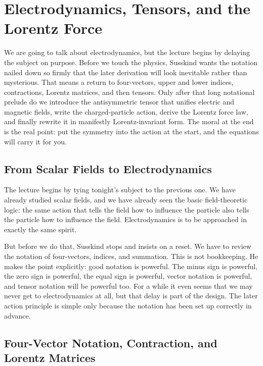 \chapter{Electrodynamics, Tensors, and the Lorentz Force}

We are going to talk about electrodynamics, but the lecture begins by delaying the subject on purpose. Before we touch the physics, Susskind wants the notation nailed down so firmly that the later derivation will look inevitable rather than mysterious. That means a return to four-vectors, upper and lower indices, contractions, Lorentz matrices, and then tensors. Only after that long notational prelude do we introduce the antisymmetric tensor that unifies electric and magnetic fields, write the charged-particle action, derive the Lorentz force law, and finally rewrite it in manifestly Lorentz-invariant form. The moral at the end is the real point: put the symmetry into the action at the start, and the equations will carry it for you.

\section{From Scalar Fields to Electrodynamics}

The lecture begins by tying tonight's subject to the previous one. We have already studied scalar fields, and we have already seen the basic field-theoretic logic: the same action that tells the field how to influence the particle also tells the particle how to influence the field. Electrodynamics is to be approached in exactly the same spirit.

But before we do that, Susskind stops and insists on a reset. We have to review the notation of four-vectors, indices, and summation. This is not bookkeeping. He makes the point explicitly: good notation is powerful. The minus sign is powerful, the zero sign is powerful, the equal sign is powerful, vector notation is powerful, and tensor notation will be powerful too. For a while it even seems that we may never get to electrodynamics at all, but that delay is part of the design. The later action principle is simple only because the notation has been set up correctly in advance.

\section{Four-Vector Notation, Contraction, and Lorentz Matrices}

